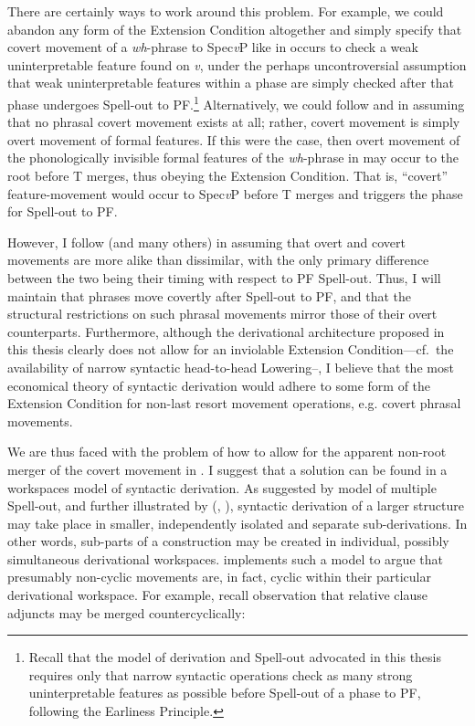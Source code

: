 There are certainly ways to work around this problem. For example, we could abandon any form of the Extension Condition altogether and simply specify that covert movement of a {\it wh}-phrase to Spec{\it v}P like in \Last occurs to check a weak uninterpretable feature found on {\it v}, under the perhaps uncontroversial assumption that weak uninterpretable features within a phase are simply checked after that phase undergoes Spell-out to PF.\footnote{Recall that the model of derivation and Spell-out advocated in this thesis requires only that narrow syntactic operations check as many strong uninterpretable features as possible before Spell-out of a phase to PF, following the Earliness Principle.} Alternatively, we could follow \citet{bobaljik1995} and \citet{groat_oneil1996} in assuming that no phrasal covert movement exists at all; rather, covert movement is simply overt movement of formal features. If this were the case, then overt movement of the phonologically invisible formal features of the {\it wh}-phrase in \Last may occur to the root before T merges, thus obeying the Extension Condition. That is, ``covert'' feature-movement would occur to Spec{\it v}P before T merges and triggers the phase for Spell-out to PF.

However, I follow \citet{nissenbaum2000} (and many others) in assuming that overt and covert movements are more alike than dissimilar, with the only primary difference between the two being their timing with respect to PF Spell-out. Thus, I will maintain that phrases move covertly after Spell-out to PF, and that the structural restrictions on such phrasal movements mirror those of their overt counterparts. Furthermore, although the derivational architecture proposed in this thesis clearly does not allow for an inviolable Extension Condition---cf.\ the availability of narrow syntactic head-to-head Lowering--, I believe that the most economical theory of syntactic derivation would adhere to some form of the Extension Condition for non-last resort movement operations, e.g. covert phrasal movements.

We are thus faced with the problem of how to allow for the apparent non-root merger of the covert movement in \Last. I suggest that a solution can be found in a workspaces model of syntactic derivation. As suggested by  model of multiple Spell-out, and further illustrated by \citeauthor{nunes2001} (\citeyear{nunes2001}, \citeyear{nunes2004}), syntactic derivation of a larger structure may take place in smaller, independently isolated and separate sub-derivations. In other words, sub-parts of a construction may be created in individual, possibly simultaneous derivational workspaces. \citet{nunes2001} implements such a model to argue that presumably non-cyclic movements are, in fact, cyclic within their particular derivational workspace. For example, recall  observation that relative clause adjuncts may be merged countercyclically:

